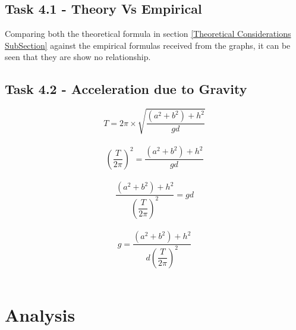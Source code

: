 \documentclass[12pt]{article}
\begin{document}

\subsection{Task 4.1 - Theory Vs Empirical}
\label{Task 4.1 Theory Vs Empirical SubSection}

Comparing both the theoretical formula in section \ref{Theoretical Considerations SubSection} against the empirical formulas received from the graphs, it can be seen that they are show no relationship.


\subsection{Task 4.2 - Acceleration due to Gravity}
\label{Task 4.2 - Acceleration due to Gravity SubSection}

\begin{equation}
{T = 2 \pi \times \sqrt{\dfrac{(a^2 + b^2)+h^2}{gd}}}
\end{equation} \\

\begin{equation} 
\left(\dfrac{T}{2\pi}\right)^2 = \dfrac{(a^2 + b^2)+h^2}{gd}
\end{equation} \\

\begin{equation}
\dfrac{(a^2 + b^2)+h^2}{\left(\dfrac{T}{2\pi}\right)^2} = gd
\end{equation} \\

\begin{equation}
g = \dfrac{(a^2 + b^2)+h^2}{d \left(\dfrac{T}{2\pi}\right)^2}
\end{equation} \\


\section{Analysis}
\label{Analysis Section}
\end{document}
